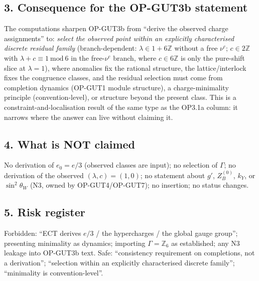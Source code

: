 \subsection*{3. Consequence for the OP-GUT3b statement}
The computations sharpen OP-GUT3b from ``derive the observed
charge assignments'' to: \emph{select the observed point within
an explicitly characterised discrete residual family}
(branch-dependent: $\lambda\in1+6\mathbb Z$ without a free
$\nu^c$; $c\in2\mathbb Z$ with $\lambda+c\equiv1\ \mathrm{mod}\ 6$
in the free-$\nu^c$ branch, where $c\in6\mathbb Z$ is only the
pure-shift slice at $\lambda=1$), where anomalies fix the rational
structure, the lattice/interlock fixes the congruence classes,
and the residual selection must come from completion dynamics
(OP-GUT1 module structure), a charge-minimality principle
(convention-level), or structure beyond the present class.
This is a constraint-and-localisation result of the same type as
the OP3.1a column: it narrows where the answer can live without
claiming it.

\subsection*{4. What is NOT claimed}
No derivation of $e_0=e/3$ (observed classes are input); no
selection of $\Gamma$; no derivation of the observed
$(\lambda,c)=(1,0)$; no statement about $g'$, $Z_B^{(0)}$, $k_Y$,
or $\sin^2\theta_W$ (N3, owned by OP-GUT4/OP-GUT7); no insertion;
no status changes.

\subsection*{5. Risk register}
Forbidden: ``ECT derives $e/3$ / the hypercharges / the global
gauge group''; presenting minimality as dynamics; importing
$\Gamma=\mathbb Z_6$ as established; any N3 leakage into
OP-GUT3b text.
Safe: ``consistency requirement on completions, not a
derivation''; ``selection within an explicitly characterised
discrete family''; ``minimality is convention-level''.

